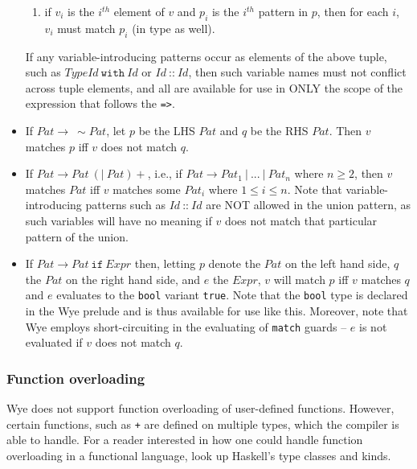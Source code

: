 \documentclass[a4paper, 12pt]{article}
\begin{document}
\begin{itemize}
\begin{enumerate}
\item if $v_i$ is the $i^{th}$ element of $v$ and $p_i$ is the $i^{th}$ pattern in $p$, then for each $i$, $v_i$ must match $p_i$ (in type as well).
\end{enumerate}
If any variable-introducing patterns occur as elements of the above tuple, such as $TypeId\:\texttt{with}\:Id$ or $Id\:\texttt{::}\:Id$, then such variable names must not conflict across tuple elements, and all are available for use in ONLY the scope of the expression that follows the \texttt{=>}.
\item If $Pat\to\:\sim Pat$, let $p$ be the LHS $Pat$ and $q$ be the RHS $Pat$. Then $v$ matches $p$ iff $v$ does not match $q$.
\item If $Pat \to Pat \:(\texttt{|}\:Pat)+$, i.e., if $Pat\to Pat_1\:\texttt{|}\:...\:\texttt{|}\: Pat_n$ where $n\geq 2$, then $v$ matches $Pat$ iff $v$ matches some $Pat_i$ where $1\leq i\leq n$. Note that variable-introducing patterns such as $Id\:\texttt{::}\:Id$ are NOT allowed in the union pattern, as such variables will have no meaning if $v$ does not match that particular pattern of the union.
\item If $Pat \to Pat\:\texttt{if}\:Expr$ then, letting $p$ denote the $Pat$ on the left hand side, $q$ the $Pat$ on the right hand side, and $e$ the $Expr$, $v$ will match $p$ iff $v$ matches $q$ and $e$ evaluates to the \texttt{bool} variant \texttt{true}. Note that the \texttt{bool} type is declared in the Wye prelude and is thus available for use like this. Moreover, note that Wye employs short-circuiting in the evaluating of \texttt{match} guards -- $e$ is not evaluated if $v$ does not match $q$.
\end{itemize}

\subsubsection{Function overloading}
Wye does not support function overloading of user-defined functions. However, certain functions, such as \texttt{+} are defined on multiple types, which the compiler is able to handle. For a reader interested in how one could handle function overloading in a functional language, look up Haskell's type classes and kinds.
\end{document}
